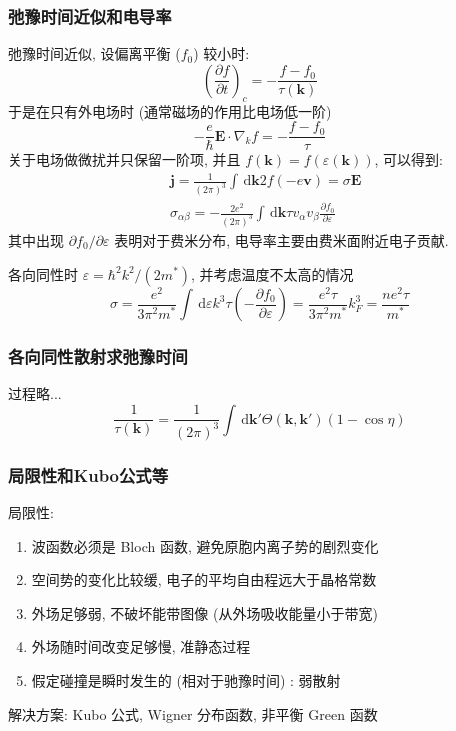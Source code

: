 \documentclass[11pt,a4paper]{article}%
\numberwithin{equation}{section}%
\renewcommand*{\vec}[1]{\bm{#1}}%
\newcommand{\dif}{\,\mathrm d}
\begin{document}
\subsubsection{弛豫时间近似和电导率} %
\label{ssub:tau_and_conduct}
弛豫时间近似, 设偏离平衡 ($f_0$) 较小时: 
\begin{equation}
	\left(\frac{\partial f}{\partial t}\right)_c = -\frac{f - f_0}{\tau(\vec k)}
\end{equation}
于是在只有外电场时 (通常磁场的作用比电场低一阶)
\begin{equation}
	-\frac{e}{\hbar}\vec E\cdot\nabla_k f = -\frac{f-f_0}{\tau}
\end{equation}
关于电场做微扰并只保留一阶项, 并且 $f(\vec k) = f(\varepsilon(\vec k))$, 可以得到: 
\begin{align}
	&\vec j = \frac 1{(2\pi)^3} \int \dif\vec k 2f(-e\vec v) = \sigma\vec E \\
	&\sigma_{\alpha\beta} = -\frac {2e^2}{(2\pi)^3}\int\dif\vec k \tau v_\alpha v_\beta \frac{\partial f_0}{\partial \varepsilon}
\end{align}
其中出现 $\partial f_0/\partial\varepsilon$ 表明对于费米分布, 电导率主要由费米面附近电子贡献.

各向同性时 $\varepsilon = \hbar^2 k^2/(2m^*)$, 并考虑温度不太高的情况
\begin{equation}
	\sigma = \frac{e^2}{3\pi^2 m^*}\int\dif\varepsilon k^3\tau\left(-\frac{\partial f_0}{\partial \varepsilon}\right) = \frac{e^2\tau}{3\pi^2m^*}k_F^3 = \frac{ne^2\tau}{m^*}
\end{equation}
\subsubsection{各向同性散射求弛豫时间} %
\label{ssub:col_for_tau}
过程略...
\begin{equation}
	\frac 1{\tau(\vec k)} = \frac{1}{(2\pi)^3}\int\dif\vec k'\Theta(\vec k,\vec k')(1-\cos\eta)
\end{equation}
\subsubsection{局限性和Kubo公式等} %
\label{ssub:improve_boltzmann}
局限性: 
\begin{enumerate}
	\item 波函数必须是 Bloch 函数, 避免原胞内离子势的剧烈变化
	\item 空间势的变化比较缓, 电子的平均自由程远大于晶格常数
	\item 外场足够弱, 不破坏能带图像 (从外场吸收能量小于带宽)
	\item 外场随时间改变足够慢, 准静态过程
	\item 假定碰撞是瞬时发生的 (相对于驰豫时间) : 弱散射
\end{enumerate}
解决方案: Kubo 公式, Wigner 分布函数, 非平衡 Green 函数
\end{document}
